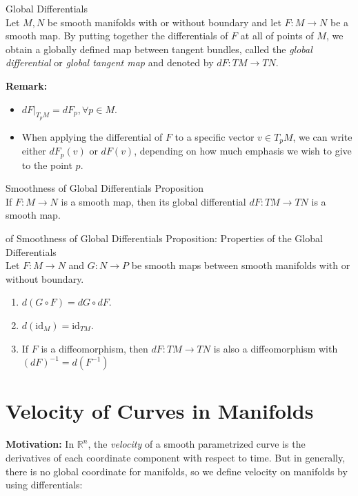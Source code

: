 \begin{definition}{Global Differentials}\\
Let $M,N$ be smooth manifolds with or without boundary and let $F:M\to N$ be a smooth map. By putting together the differentials of $F$ at all of points of $M$, we obtain a globally defined map between tangent bundles, called the \textit{global differential} or \textit{global tangent map} and denoted by $dF:TM \to TN$.
\end{definition}

\noindent\textbf{Remark:} \begin{itemize}
    \item $dF|_{T_pM}=dF_p, \forall p\in M$.
    \item When applying the differential of $F$ to a specific vector $v\in T_pM$, we can write either $dF_p(v)$ or $dF(v)$, depending on how much emphasis we wish to give to the point $p$.
\end{itemize}

\begin{proposition}{Smoothness of Global Differentials Proposition}\\
If $F:M\to N$ is a smooth map, then its global differential $dF:TM \to TN$ is a smooth map.
\end{proposition}

\begin{corollary}{of Smoothness of Global Differentials Proposition: Properties of the Global Differentials}\\
Let $F:M\to N$ and $G:N\to P$ be smooth maps between smooth manifolds with or without boundary.
\begin{enumerate}
    \item $d(G\circ F)= dG\circ dF$.
    \item $d(\text{id}_M)= \text{id}_{TM}$.
    \item If $F$ is a diffeomorphism, then $dF:TM \to TN$ is also a diffeomorphism with $(dF)^{-1}= d(F^{-1})$
\end{enumerate}
\end{corollary}

\section{Velocity of Curves in Manifolds}

\noindent\textbf{Motivation:} In $\mathbb{R}^n$, the \textit{velocity} of a smooth parametrized curve is the derivatives of each coordinate component with respect to time. But in generally, there is no global coordinate for manifolds, so we define velocity on manifolds by using differentials:

